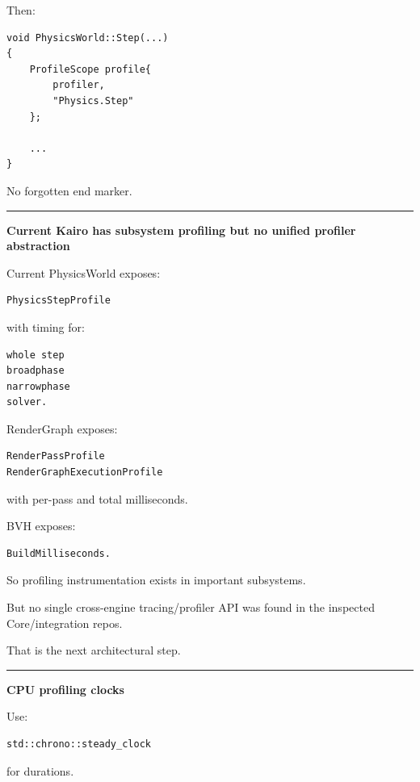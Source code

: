 Then:

\begin{verbatim}
void PhysicsWorld::Step(...)
{
    ProfileScope profile{
        profiler,
        "Physics.Step"
    };

    ...
}
\end{verbatim}

No forgotten end marker.

\begin{center}\rule{0.5\linewidth}{0.5pt}\end{center}

\textbf{Current Kairo has subsystem profiling but no unified profiler abstraction}

Current PhysicsWorld exposes:

\begin{verbatim}
PhysicsStepProfile
\end{verbatim}

with timing for:

\begin{verbatim}
whole step
broadphase
narrowphase
solver.
\end{verbatim}

RenderGraph exposes:

\begin{verbatim}
RenderPassProfile
RenderGraphExecutionProfile
\end{verbatim}

with per-pass and total milliseconds.

BVH exposes:

\begin{verbatim}
BuildMilliseconds.
\end{verbatim}

So profiling instrumentation exists in important subsystems.

But no single cross-engine tracing/profiler API was found in the inspected Core/integration repos.

That is the next architectural step.

\begin{center}\rule{0.5\linewidth}{0.5pt}\end{center}

\textbf{CPU profiling clocks}

Use:

\begin{verbatim}
std::chrono::steady_clock
\end{verbatim}

for durations.

